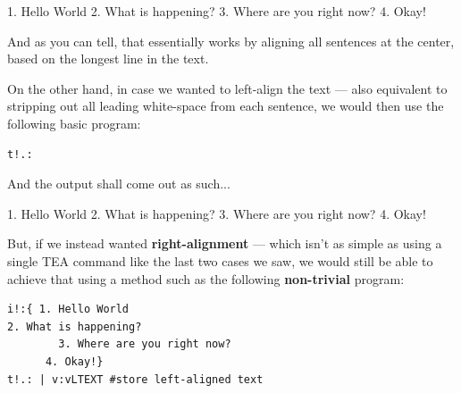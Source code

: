 \documentclass[a4paper, 18pt]{book} %
\begin{document}
{{{     \begin{tcbverbatim}[title=T: SAMPLE OUTPUT from EXAMPLE 4]
      1. Hello World       
   2. What is happening?   
3. Where are you right now?
         4. Okay!            
  \end{tcbverbatim}
  
  
 \vspace{2em}
 
 And as you can tell, that essentially works by aligning all sentences at the center, based on the longest line in the text.
 
 \vspace{2em}
 
 On the other hand, in case we wanted to left-align the text --- also equivalent to stripping out all leading white-space from each sentence, we would then use the following basic program:
 
 
   \vspace{2em}
 
  \begin{tcolorbox}[teaterminalstyle, title=T: EXAMPLE 5: Basic Left-alignment Program, breakable]
  \begin{lstlisting}[language=TEA,breaklines=true,]
t!.:
   \end{lstlisting}
  \end{tcolorbox}

\vspace{1em}

And the output shall come out as such...


\vspace{2em}


     \begin{tcbverbatim}[title=T: SAMPLE OUTPUT from EXAMPLE 5]
1. Hello World
2. What is happening?
3. Where are you right now?
4. Okay!          
  \end{tcbverbatim}
  
  
 \vspace{2em}
 
 
 But, if we instead wanted \textbf{right-alignment} --- which isn't as simple as using a single TEA command like the last two cases we saw, we would still be able to achieve that using a method such as the following \textbf{non-trivial} program:
 
 
 
   \begin{tcolorbox}[teaterminalstyle, title=T: EXAMPLE 6: ROBUST Right-alignment Program, breakable]
  \begin{lstlisting}[language=TEA,breaklines=true,]
i!:{ 1. Hello World
2. What is happening?
        3. Where are you right now?
      4. Okay!}
t!.: | v:vLTEXT #store left-aligned text


\end{lstlisting}
\end{tcolorbox}}}}
\end{document}
